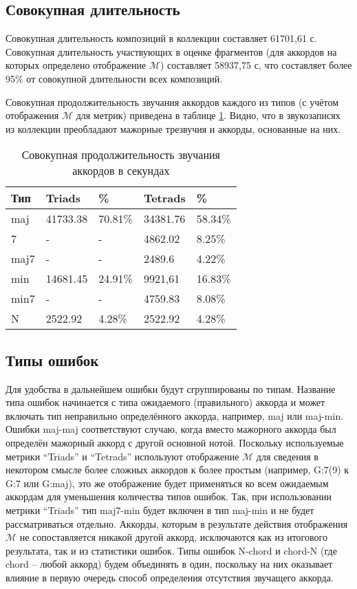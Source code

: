 \subsection{Совокупная длительность}

Совокупная длительность композиций в коллекции составляет 61701,61 с. Совокупная
длительность участвующих в оценке фрагментов (для аккордов на которых определено
отображение $\mathcal{M}$) составляет 58937,75 с, что составляет более 95\% от
совокупной длительности всех композиций.

Совокупная продолжительность звучания аккордов каждого из типов (с учётом
отображения $\mathcal{M}$ для метрик) приведена в таблице \ref{Tchord_stat}.
Видно, что в звукозаписях из коллекции преобладают мажорные трезвучия и аккорды,
основанные на них.

\begin{table} [htbp]
  \centering
  \parbox{15cm}{\caption{Совокупная продолжительность звучания аккордов в
  секундах}
  \label{Tchord_stat}}
  \begin{tabular}{|l||l|l||l|l|}
  \hline
  Тип & Triads & \% & Tetrads & \% \\
  \hline
  maj & 41733.38 & 70.81\% & 34381.76 & 58.34\% \\
  7 & - & - & 4862.02 & 8.25\% \\
  maj7 & - & - & 2489.6 & 4.22\% \\
  \hline
  min & 14681.45 & 24.91\% & 9921,61 & 16.83\% \\
  min7 & - & - & 4759.83 & 8.08\% \\
  N & 2522.92 & 4.28\% & 2522.92 & 4.28\% \\
  \hline
  \end{tabular}
\end{table}

\subsection{Типы ошибок}

Для удобства в дальнейшем ошибки будут сгруппированы по типам. Название типа
ошибок начинается с типа ожидаемого (правильного) аккорда и может включать тип
неправильно определённого аккорда, например, maj или maj-min. Ошибки maj-maj
соответствуют случаю, когда вместо мажорного аккорда был определён мажорный
аккорд с другой основной нотой. Поскольку используемые метрики ``Triads'' и
``Tetrads'' используют отображение $\mathcal{M}$ для сведения в некотором
смысле более сложных аккордов к более простым (например, G:7(9) к G:7 или
G:maj), это же отображение будет применяться ко всем ожидаемым аккордам для
уменьшения количества типов ошибок. Так, при использовании метрики ``Triads''
тип maj7-min будет включен в тип maj-min и не будет рассматриваться отдельно.
Аккорды, которым в результате действия отображения $\mathcal{M}$ не
сопоставляется никакой другой аккорд, исключаются как из итогового результата,
так и из статистики ошибок. Типы ошибок N-chord и chord-N (где chord -- любой
аккорд) будем объединять в один, поскольку на них оказывает влияние в первую
очередь способ определения отсутствия звучащего аккорда.

